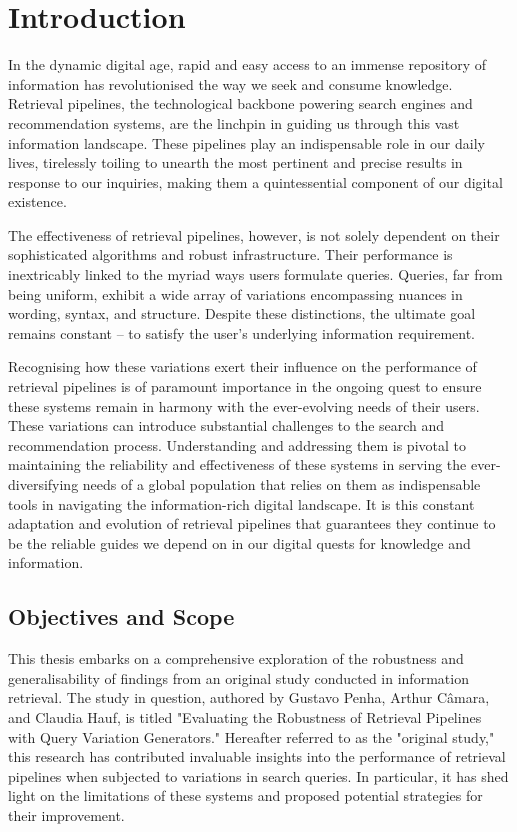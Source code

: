 \chapter{Introduction}
In the dynamic digital age, rapid and easy access to an immense repository of information has revolutionised the way we seek and consume knowledge. Retrieval pipelines, the technological backbone powering search engines and recommendation systems, are the linchpin in guiding us through this vast information landscape. These pipelines play an indispensable role in our daily lives, tirelessly toiling to unearth the most pertinent and precise results in response to our inquiries, making them a quintessential component of our digital existence.

The effectiveness of retrieval pipelines, however, is not solely dependent on their sophisticated algorithms and robust infrastructure. Their performance is inextricably linked to the myriad ways users formulate queries. Queries, far from being uniform, exhibit a wide array of variations encompassing nuances in wording, syntax, and structure. Despite these distinctions, the ultimate goal remains constant – to satisfy the user's underlying information requirement.

Recognising how these variations exert their influence on the performance of retrieval pipelines is of paramount importance in the ongoing quest to ensure these systems remain in harmony with the ever-evolving needs of their users. These variations can introduce substantial challenges to the search and recommendation process. Understanding and addressing them is pivotal to maintaining the reliability and effectiveness of these systems in serving the ever-diversifying needs of a global population that relies on them as indispensable tools in navigating the information-rich digital landscape. It is this constant adaptation and evolution of retrieval pipelines that guarantees they continue to be the reliable guides we depend on in our digital quests for knowledge and information.

\section{Objectives and Scope}
This thesis embarks on a comprehensive exploration of the robustness and generalisability of findings from an original study conducted in information retrieval. The study in question, authored by Gustavo Penha, Arthur Câmara, and Claudia Hauf, is titled "Evaluating the Robustness of Retrieval Pipelines with Query Variation Generators." Hereafter referred to as the "original study," this research has contributed invaluable insights into the performance of retrieval pipelines when subjected to variations in search queries. In particular, it has shed light on the limitations of these systems and proposed potential strategies for their improvement.

